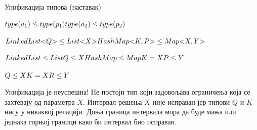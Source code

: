 \documentclass[xcolor=table]{beamer}
\begin{document}
\begin{frame}[allowframebreaks]{Унификација типова (наставак)}
        \framebreak
        
        \begin{math}
type(a_1) \leq type(p_1)
\newline
type(a_2) \leq type(p_2)
\newline
        \end{math}
        
        \framebreak
        
        \begin{math}
LinkedList\mathord{<}Q\mathord{>} \leq List\mathord{<}X\mathord{>}
\newline
HashMap\mathord{<}K, P\mathord{>} \leq Map\mathord{<}X, Y\mathord{>}
        \end{math}
        
        \framebreak
        
        \begin{math}
LinkedList \leq List
\newline
Q \leq X
\newline
HashMap \leq Map
\newline
K = X
\newline
P \leq Y
        \end{math}
        
        \framebreak
        
        \begin{math}
Q \leq X
\newline
K = X
\newline
R \leq Y
\newline
        \end{math}
        
        Унификација је неуспешна!
        \newline\newline
        Не постоји тип који задовољава ограничења која се захтевају од параметра \begin{math}X\end{math}.
        \newline\newline
        Интервал решења \begin{math}X\end{math} није исправан јер типови \begin{math}Q\end{math} и \begin{math}K\end{math} нису у никаквој релацији.
        \newline\newline
        Доња граница интервала мора да буде мања или једнака горњој граници како би интервал био исправан.
        

\end{frame}
\end{document}
